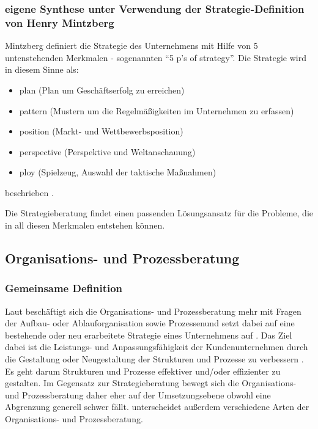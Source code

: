 \subsubsection{eigene Synthese unter Verwendung der Strategie-Definition von Henry Mintzberg} %
Mintzberg definiert die Strategie des Unternehmens mit Hilfe von 5 untenstehenden Merkmalen - sogenannten “5 p’s of strategy”.
Die Strategie wird in diesem Sinne als: 
\begin{itemize}

\item plan (Plan um Geschäftserfolg zu erreichen)
\item pattern (Mustern um die Regelmäßigkeiten im Unternehmen zu erfassen)
\item position (Markt- und Wettbewerbsposition)
\item perspective (Perspektive und Weltanschauung)
\item ploy (Spielzeug, Auswahl der taktische Maßnahmen) 
\end{itemize}
beschrieben \cite{5Ps}.

Die Strategieberatung findet einen passenden Lösungsansatz für die Probleme, die in all diesen Merkmalen  entstehen können.


\subsection{Organisations- und Prozessberatung}

\subsubsection*{Gemeinsame Definition}
Laut \cite[63]{Lippold201309} beschäftigt sich die Organisations- und Prozessberatung mehr \glqq mit Fragen der Aufbau- oder Ablauforganisation sowie Prozessen\grqq und setzt dabei auf eine \glqq bestehende oder neu erarbeitete Strategie eines Unternehmens auf \grqq. Das Ziel \glqq dabei ist die Leistungs- und Anpassungsfähigkeit der Kundenunternehmen durch die Gestaltung oder Neugestaltung der Strukturen und Prozesse zu verbessern \grqq. Es geht darum Strukturen und Prozesse \glqq effektiver und/oder effizienter \grqq zu gestalten. Im Gegensatz zur Strategieberatung bewegt sich die Organisations- und Prozessberatung daher eher auf der Umsetzungsebene obwohl eine Abgrenzung generell schwer fällt. \cite[63]{Lippold201309} unterscheidet außerdem verschiedene Arten der Organisations- und Prozessberatung.

